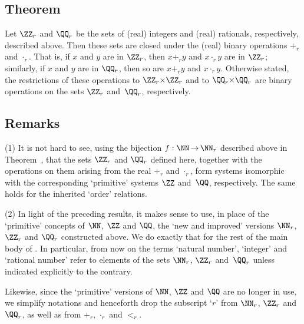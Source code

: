 \V

        \subsection{\small{{\bf Theorem}}}
        \label{ThmB25.50}

\V

        Let ${\ZZ}_{r}$ and ${\QQ}_{r}$ be the sets of (real) integers and (real) rationals, respectively, described above.
    Then these sets are closed under the (real) binary operations $+_{r}$ and ${\cdot}_{r}$.
    That is, if $x$ and $y$ are in ${\ZZ}_{r}$, then $x+_{r}y$ and $x{\cdot}_{r}y$ are in ${\ZZ}_{r}$;
    similarly, if $x$ and $y$ are in ${\QQ}_{r}$, then so are $x+_{r}y$ and $x{\cdot}_{r}y$.
    Otherwise stated, the restrictions of these operations to ${\ZZ}_{r}{\times}{\ZZ}_{r}$
    and to ${\QQ}_{r}{\times}{\QQ}_{r}$ are binary operations on the sets ${\ZZ}_{r}$ and~${\QQ}_{r}$, respectively.

\VV
        \subsection{\small{{\bf Remarks}}}
        \label{ThmB25.55}

\V

\hspace*{\parindent}(1) It is not hard to see, using the bijection $f:{\NN}  \,{\rightarrow}\, {\NN}_{r}$ described above in Theorem~,
    that the sets ${\ZZ}_{r}$ and ${\QQ}_{r}$ defined here, together with the operations on them arising from the real $+_{r}$ and ${\cdot}_{r}$,
    form systems isomorphic with the corresponding `primitive' systems ${\ZZ}$ and~${\QQ}$, respectively.
    The same holds for the inherited `order' relations.

\V

        (2) In light of the preceding results, it makes sense to use, in place of the `primitive' concepts of ${\NN}$, ${\ZZ}$ and ${\QQ}$,
    the `new and improved' versions ${\NN}_{r}$, ${\ZZ}_{r}$ and ${\QQ}_{r}$ constructed above.
    We do exactly that for the rest of the main body of {\ThisText}. In particular, from now on the terms `natural number', `integer' and
    `rational number' refer to elements of the sets ${\NN}_{r}$, ${\ZZ}_{r}$ and~${\QQ}_{r}$ unless indicated explicitly to the contrary.

        Likewise, since the `primitive' versions of ${\NN}$, ${\ZZ}$ and ${\QQ}$ are no longer in use, we simplify notations and henceforth
    drop the subscript `$r$' from ${\NN}_{r}$, ${\ZZ}_{r}$ and ${\QQ}_{r}$, as well as from $+_{r}$, ${\cdot}_{r}$ and $<_{r}$.

